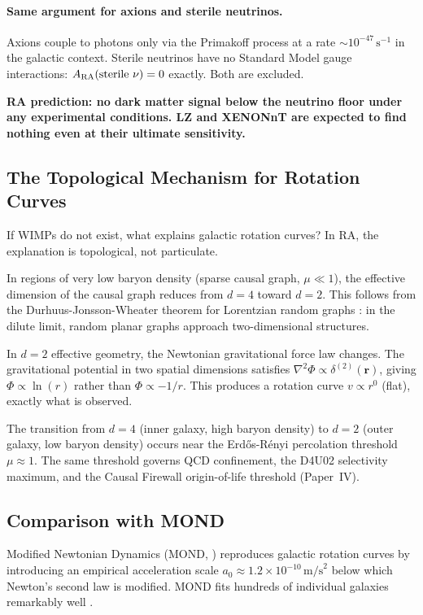 \documentclass[12pt,a4paper]{article}
\begin{document}
\paragraph{Same argument for axions and sterile neutrinos.}
Axions couple to photons only via the Primakoff process at a rate $\sim10^{-47}\,\mathrm{s}^{-1}$ in the galactic context.  Sterile neutrinos have no Standard Model gauge interactions: $A_{\rm RA}(\text{sterile }\nu)=0$ exactly.  Both are excluded.

\textbf{RA prediction: no dark matter signal below the neutrino floor under any experimental conditions.  LZ and XENONnT are expected to find nothing even at their ultimate sensitivity.}

\subsection{The Topological Mechanism for Rotation Curves}

If WIMPs do not exist, what explains galactic rotation curves?  In RA, the explanation is topological, not particulate.

In regions of very low baryon density (sparse causal graph, $\mu\ll1$), the effective dimension of the causal graph reduces from $d=4$ toward $d=2$.  This follows from the Durhuus-Jonsson-Wheater theorem for Lorentzian random graphs \cite{Durhuus1995}: in the dilute limit, random planar graphs approach two-dimensional structures.

In $d=2$ effective geometry, the Newtonian gravitational force law changes.  The gravitational potential in two spatial dimensions satisfies $\nabla^2\Phi\propto\delta^{(2)}(\mathbf{r})$, giving $\Phi\propto\ln(r)$ rather than $\Phi\propto-1/r$.  This produces a rotation curve $v\propto r^0$ (flat), exactly what is observed.

The transition from $d=4$ (inner galaxy, high baryon density) to $d=2$ (outer galaxy, low baryon density) occurs near the Erd\H{o}s-R\'enyi percolation threshold $\mu\approx1$.  The same threshold governs QCD confinement, the D4U02 selectivity maximum, and the Causal Firewall origin-of-life threshold (Paper~IV).

\subsection{Comparison with MOND}\label{sec:mond}

Modified Newtonian Dynamics (MOND, \cite{Milgrom1983}) reproduces galactic rotation curves by introducing an empirical acceleration scale $a_0\approx1.2\times10^{-10}\,\mathrm{m/s}^2$ below which Newton's second law is modified.  MOND fits hundreds of individual galaxies remarkably well \cite{McGaugh2016}.
\end{document}
